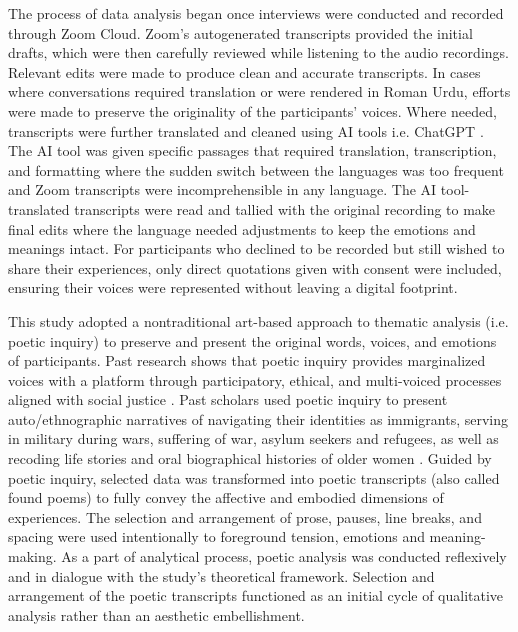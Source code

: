 The process of data analysis began once interviews were conducted and recorded through Zoom Cloud. Zoom’s autogenerated transcripts provided the initial drafts, which were then carefully reviewed while listening to the audio recordings. Relevant edits were made to produce clean and accurate transcripts. In cases where conversations required translation or were rendered in Roman Urdu, efforts were made to preserve the originality of the participants’ voices. Where needed, transcripts were further translated and cleaned using AI tools i.e. ChatGPT \citep{naeemThematicAnalysisArtificial2025}. The AI tool was given specific passages that required translation, transcription, and formatting where the sudden switch between the languages was too frequent and Zoom transcripts were incomprehensible in any language. The AI tool-translated transcripts were read and tallied with the original recording to make final edits where the language needed adjustments to keep the emotions and meanings intact. For participants who declined to be recorded but still wished to share their experiences, only direct quotations given with consent were included, ensuring their voices were represented without leaving a digital footprint. 

This study adopted a nontraditional art-based approach to thematic analysis (i.e. poetic inquiry) to preserve and present the original words, voices, and emotions of participants. Past research shows that poetic inquiry provides marginalized voices with a platform through participatory, ethical, and multi-voiced processes aligned with social justice \citep{gioiachiltonArtsBasedResearchPractice2014}. Past scholars used poetic inquiry to present auto/ethnographic narratives of navigating their identities as immigrants, serving in military during wars, suffering of war, asylum seekers and refugees, as well as recoding life stories and oral biographical histories of older women \citep{faulknerPoeticPortraitureCritical2022, faulknerPoeticPortraitsOlder2026}. Guided by poetic inquiry, selected data was transformed into poetic transcripts (also called found poems) to fully convey the affective and embodied dimensions of experiences. The selection and arrangement of prose, pauses, line breaks, and spacing were used intentionally to foreground tension, emotions and meaning-making. As a part of analytical process, poetic analysis was conducted reflexively and in dialogue with the study’s theoretical framework. Selection and arrangement of the poetic transcripts functioned as an initial cycle of qualitative analysis rather than an aesthetic embellishment. 

